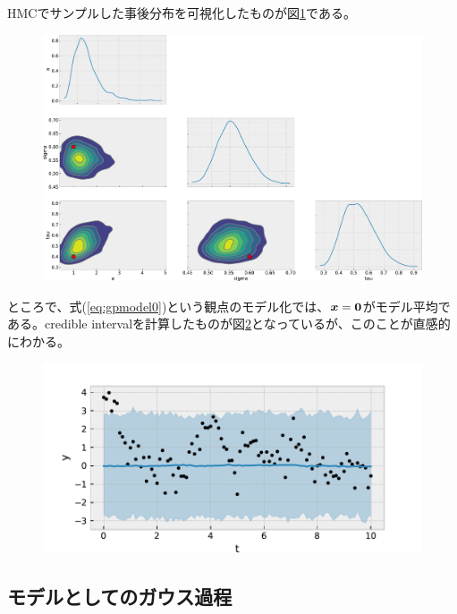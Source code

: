 HMCでサンプルした事後分布を可視化したものが図\ref{fig:gp2}である。
\begin{figure}[htb]
\begin{center}
\includegraphics[width=\linewidth]{fig/gp/gp2.pdf}
\caption{\label{fig:gp2}}
\end{center}
\end{figure}
ところで、式(\ref{eq:gpmodel0})という観点のモデル化では、$\boldsymbol{x}=\boldsymbol{0}$がモデル平均である。credible intervalを計算したものが図\ref{fig:gp3}となっているが、このことが直感的にわかる。
\begin{figure}[htb]
\begin{center}
\includegraphics[width=\linewidth]{fig/gp/gp3.pdf}
\caption{\label{fig:gp3}}
\end{center}
\end{figure}


\subsection*{モデルとしてのガウス過程}

